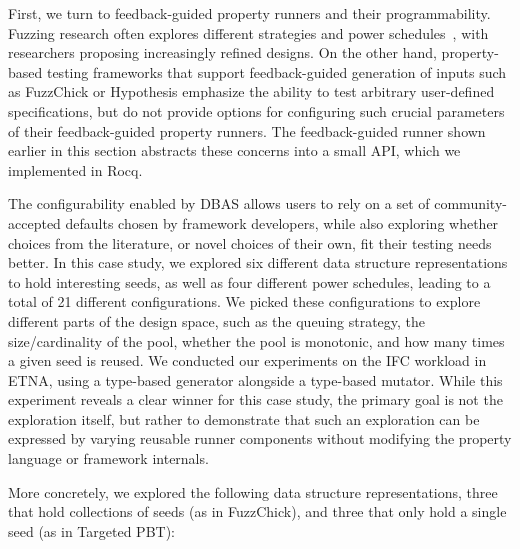 First, we turn to feedback-guided property runners and their programmability. Fuzzing
research often explores different strategies and power schedules~\cite{aflplusplus,
  10.1145/3551349.3559550,DBLP:conf/sigsoft/BohmeMC20, DBLP:journals/tse/BohmePR19}, with
researchers proposing increasingly refined designs. On the other hand, property-based
testing frameworks that support feedback-guided generation of inputs such as FuzzChick
or Hypothesis emphasize the ability to test arbitrary user-defined specifications, but
do not provide options for configuring such crucial parameters of their feedback-guided
property runners. The feedback-guided runner shown earlier in this section abstracts
these concerns into a small API, which we implemented in Rocq.

The configurability enabled by DBAS allows users to rely on a set of community-accepted
defaults chosen by framework developers, while also exploring whether choices from the
literature, or novel choices of their own, fit their testing needs better. In this case
study, we explored six different data structure representations to hold interesting
seeds, as well as four different power schedules, leading to a total of 21 different
configurations. We picked these configurations to explore different parts of the design
space, such as the queuing strategy, the size/cardinality of the pool, whether the pool
is monotonic, and how many times a given seed is reused. We conducted our experiments
on the IFC workload in ETNA, using a type-based generator alongside a type-based
mutator. While this experiment reveals a clear winner for this case study, the primary
goal is not the exploration itself, but rather to demonstrate that such an exploration
can be expressed by varying reusable runner components without modifying the property
language or framework internals.

More concretely, we explored the following data structure representations, three that
hold collections of seeds (as in FuzzChick), and three that only hold a single seed (as
in Targeted PBT):

